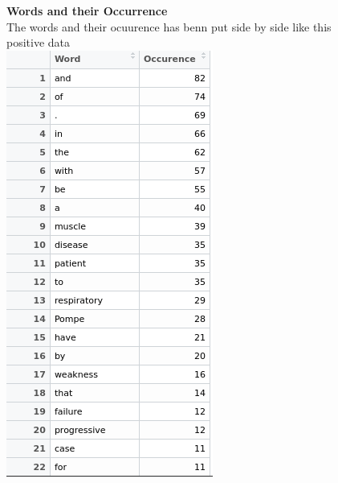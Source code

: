 \documentclass{article}
\begin{document}
 {\LARGE \textbf {Words and their Occurrence}}\\
 The words and their ocuurence has benn put side by side like this\\
 positive data\\
 \includegraphics[width=0.6\linewidth]{word_occurence_pos.png}
\end{document}

